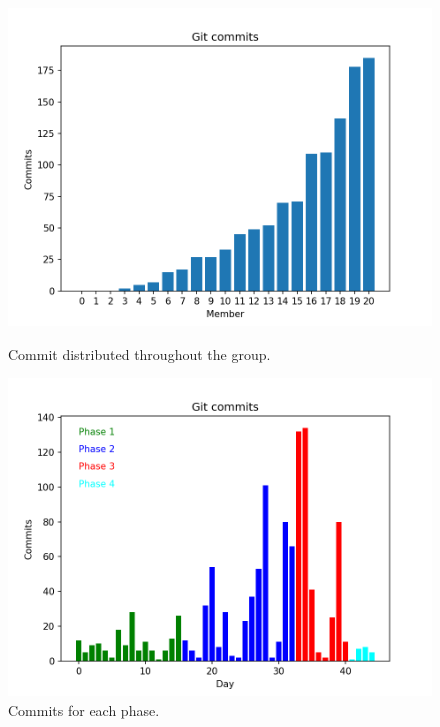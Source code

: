 \documentclass{article}
\begin{document}
        \begin{figure}[!htb]
            \endminipage\hfill
              \includegraphics[width=\linewidth]{images/commits.png}
              \caption{Commit distributed throughout the group.}\label{fig:commits}
            \endminipage\hfill
              \includegraphics[width=\linewidth]{images/commits_total.png}
              \caption{Commits for each phase.}\label{fig:commits_total}
            \endminipage\hfill
            \endminipage\hfill
        \end{figure}
\end{document}
